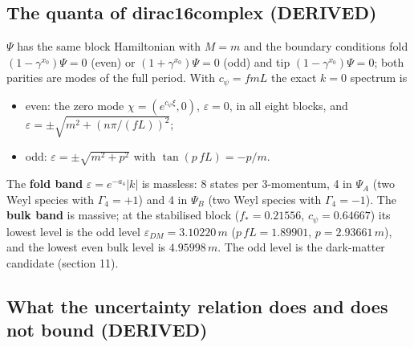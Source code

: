 \documentclass[
  10pt,
]{article}
\providecommand{\tightlist}{%
  \setlength{\itemsep}{0pt}\setlength{\parskip}{0pt}}
\begin{document}
\hypertarget{the-quanta-of-dirac16complex-derived}{%
\subsection{The quanta of dirac16complex
(DERIVED)}\label{the-quanta-of-dirac16complex-derived}}

\(\Psi\) has the same block Hamiltonian with \(M = m\) and the boundary
conditions fold \((1 - \gamma^{x_0})\Psi = 0\) (even) or
\((1 + \gamma^{x_0})\Psi = 0\) (odd) and tip
\((1 - \gamma^{x_0})\Psi = 0\); both parities are modes of the full
period. With \(c_\psi = f m L\) the exact \(k = 0\) spectrum is

\begin{itemize}
\tightlist
\item
  even: the zero mode \(\chi = (e^{c_\psi\xi}, 0)\),
  \(\varepsilon = 0\), in all eight blocks, and
  \(\varepsilon = \pm\sqrt{m^2 + (n\pi/(fL))^2}\);
\item
  odd: \(\varepsilon = \pm\sqrt{m^2 + p^2}\) with
  \(\tan(p\,fL) = -p/m\).
\end{itemize}

The \textbf{fold band} \(\varepsilon = e^{-a_4}|k|\) is massless: 8
states per 3-momentum, 4 in \(\Psi_A\) (two Weyl species with
\(\Gamma_4 = +1\)) and 4 in \(\Psi_B\) (two Weyl species with
\(\Gamma_4 = -1\)). The \textbf{bulk band} is massive; at the stabilised
block (\(f_* = 0.21556\), \(c_\psi = 0.64667\)) its lowest level is the
odd level \(\varepsilon_{DM} = 3.10220\,m\) (\(p\,fL = 1.89901\),
\(p = 2.93661\,m\)), and the lowest even bulk level is \(4.95998\,m\).
The odd level is the dark-matter candidate (section 11).

\hypertarget{what-the-uncertainty-relation-does-and-does-not-bound-derived}{%
\subsection{What the uncertainty relation does and does not bound
(DERIVED)}\label{what-the-uncertainty-relation-does-and-does-not-bound-derived}}
\end{document}
